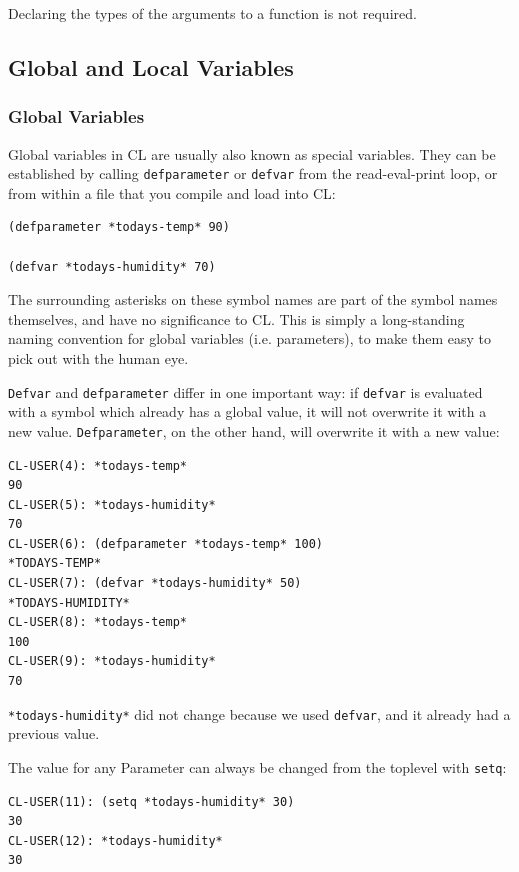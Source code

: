 Declaring the types of the arguments to a function is not required.

\subsection{Global and Local Variables}

\subsubsection{Global Variables}

Global variables in CL are usually also known as special variables. They can be established
by calling \texttt{defparameter} or \texttt{defvar} from the read-eval-print loop, or from within a file that
you compile and load into CL:

\begin{verbatim}
(defparameter *todays-temp* 90)

(defvar *todays-humidity* 70)
\end{verbatim}

The surrounding asterisks on these symbol names are part of the symbol names themselves,
and have no significance to CL. This is simply a long-standing naming convention for global
variables (i.e. parameters), to make them easy to pick out with the human eye.

\texttt{Defvar} and \texttt{defparameter} differ in one important way: if \texttt{defvar} is evaluated with
a symbol which already has a global value, it will not overwrite it with a new value.
\texttt{Defparameter}, on the other hand, will overwrite it with a new value:

\begin{verbatim}
CL-USER(4): *todays-temp*
90
CL-USER(5): *todays-humidity*
70
CL-USER(6): (defparameter *todays-temp* 100)
*TODAYS-TEMP*
CL-USER(7): (defvar *todays-humidity* 50)
*TODAYS-HUMIDITY*
CL-USER(8): *todays-temp*
100
CL-USER(9): *todays-humidity*
70
\end{verbatim}

\texttt{*todays-humidity*} did not change because we used \texttt{defvar}, and it already had a previous
value.

The value for any Parameter can always be changed from the toplevel with \texttt{setq}:

\begin{verbatim}
CL-USER(11): (setq *todays-humidity* 30)
30
CL-USER(12): *todays-humidity*
30
\end{verbatim}

